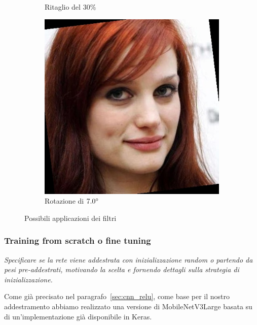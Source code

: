 \begin{figure}[ht]
\begin{subfigure}[t]{0.18\textwidth}
\caption{Ritaglio del $30\%$}
\label{sfig:corruption_random_crop}
\end{subfigure}\hfill
\begin{subfigure}[t]{0.18\textwidth}
\includegraphics[width=\textwidth]{./Images/rotation_severity_7.0.jpg}
\caption{Rotazione di $7.0 \degree$}
\label{sfig:corruption_rotation}
\end{subfigure}\hfill
\caption{Possibili applicazioni dei filtri}
\label{sfig:data_augmentation}
\end{figure}

\subsubsection{Training from scratch o fine tuning}
\emph{Specificare se la rete viene addestrata con inizializzazione random o partendo da pesi pre-addestrati, motivando la scelta e fornendo dettagli sulla strategia di inizializzazione.}

Come già precisato nel paragrafo~\ref{sec:cnn_relu}, come base per il nostro addestramento abbiamo realizzato una versione di MobileNetV3Large basata su di un'implementazione già disponibile in Keras. 

